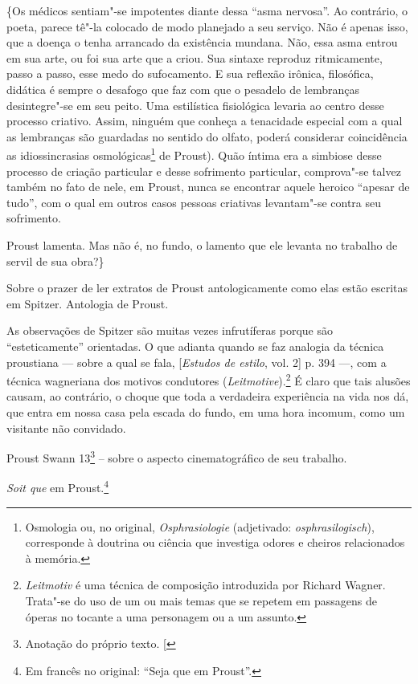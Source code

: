 \{Os médicos sentiam"-se impotentes diante dessa ``asma nervosa''. Ao
contrário, o poeta, parece tê"-la colocado de modo planejado a seu
serviço. Não é apenas isso, que a doença o tenha arrancado da existência
mundana. Não, essa asma entrou em sua arte, ou foi sua arte que a criou.
Sua sintaxe reproduz ritmicamente, passo a passo, esse medo do
sufocamento. E sua reflexão irônica, filosófica, didática é sempre o
desafogo que faz com que o pesadelo de lembranças desintegre"-se em seu
peito. Uma estilística fisiológica levaria ao centro desse processo
criativo. Assim, ninguém que conheça a tenacidade especial com a qual as
lembranças são guardadas no sentido do olfato, poderá considerar
coincidência as idiossincrasias osmológicas\footnote{Osmologia ou,
  no original, \emph{Osphrasiologie} (adjetivado:
  \emph{osphrasilogisch}), corresponde à doutrina ou ciência que
  investiga odores e cheiros relacionados à memória. \versal{[N.~O.]}} de Proust). Quão
íntima era a simbiose desse processo de criação particular e desse
sofrimento particular, comprova"-se talvez também no fato de nele, em
Proust, nunca se encontrar aquele heroico ``apesar de tudo'', com o qual em outros casos pessoas criativas levantam"-se contra seu sofrimento.

Proust lamenta. Mas não é, no fundo, o lamento que ele levanta no
trabalho de servil de sua obra?\}

Sobre o prazer de ler extratos de Proust antologicamente como elas estão
escritas em Spitzer. Antologia de Proust.

As observações de Spitzer são muitas vezes infrutíferas porque são
``esteticamente'' orientadas. O que adianta quando se faz analogia da
técnica proustiana --- sobre a qual se fala, {[}\emph{Estudos de estilo},
vol. 2{]} p. 394 ---, com a técnica wagneriana dos motivos condutores
(\emph{Leitmotive}).\footnote{\emph{Leitmotiv} é uma técnica de
  composição introduzida por Richard Wagner. Trata"-se do uso de um ou
  mais temas que se repetem em passagens de óperas no tocante a uma
  personagem ou a um assunto. \versal{[N.~O.]}} É claro que tais alusões causam, ao
contrário, o choque que toda a verdadeira experiência na vida nos dá,
que entra em nossa casa pela escada do fundo, em uma hora incomum, como
um visitante não convidado.

Proust Swann  13\footnote{Anotação do próprio texto. {[}\versal{N.~T.}{]}} -- sobre o aspecto cinematográfico de seu trabalho.

\emph{Soit que} em Proust.\footnote{Em francês no original: ``Seja
  que em Proust''. \versal{[N.~T.]}}

